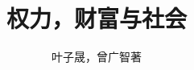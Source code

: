 \documentclass[12pt,heading=true]{book}
\begin{document}
\title{权力，财富与社会}
\author{叶子晟，曾广智\quad 著}
\date{}
\maketitle

\tableofcontents


\end{document}
